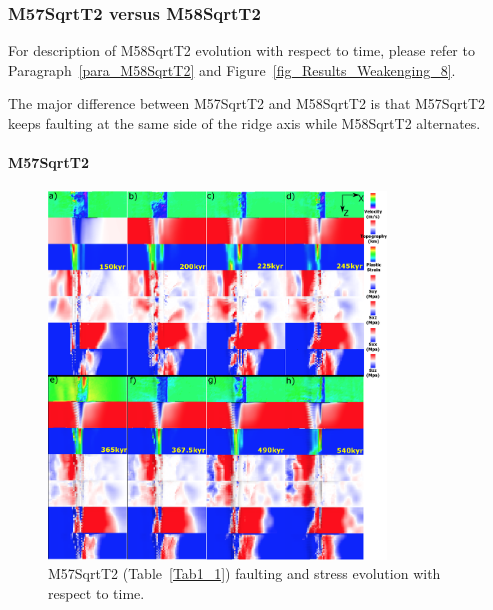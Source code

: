 \subsubsection{M57SqrtT2 versus M58SqrtT2}

For description of M58SqrtT2 evolution with respect to time, please refer to Paragraph~\hyperref[para_M58SqrtT2]{\ref{para_M58SqrtT2}} and Figure~\hyperref[fig_Results_Weakenging_8]{\ref{fig_Results_Weakenging_8}}.

The major difference between M57SqrtT2 and M58SqrtT2 is that M57SqrtT2 keeps faulting at the same side of the ridge axis while M58SqrtT2 alternates.

\paragraph{M57SqrtT2}

\begin{figure}[h]
 \centering
  \includegraphics[width=0.8\textwidth]{./Figures/fig_Results_MRange_3_M57SqrtT2_time_evolution.eps}
 \caption{M57SqrtT2 (Table~\hyperref[Tab1_1]{\ref{Tab1_1}}) faulting and stress evolution with respect to time.}
\label{fig_Results_MRange_3}
\end{figure}

